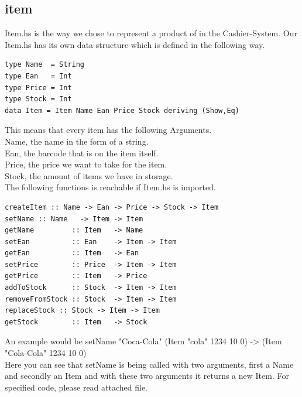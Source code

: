 \documentclass[11pt]{article}
\begin{document}
\subsection{item}
Item.hs is the way we chose to represent a product of in the Cashier-System. Our Item.hs has its own data structure which is defined in the following way.
\begin{lstlisting}
type Name  = String
type Ean   = Int
type Price = Int
type Stock = Int
data Item = Item Name Ean Price Stock deriving (Show,Eq)
\end{lstlisting}
This means that every item has the following Arguments.\\
Name, the name in the form of a string.\\
Ean, the barcode that is on the item itself.\\
Price, the price we want to take for the item.\\
Stock, the amount of items we have in storage.\\
The following functions is reachable if Item.hs is imported.\\
\begin{lstlisting}
createItem :: Name -> Ean -> Price -> Stock -> Item
setName :: Name   -> Item -> Item
getName         :: Item   -> Name
setEan          :: Ean    -> Item -> Item
getEan          :: Item   -> Ean
setPrice        :: Price  -> Item -> Item
getPrice        :: Item   -> Price
addToStock      :: Stock  -> Item -> Item
removeFromStock :: Stock  -> Item -> Item
replaceStock :: Stock -> Item -> Item
getStock        :: Item   -> Stock
\end{lstlisting}
An example would be setName "Coca-Cola" (Item "cola" 1234 10 0) -> (Item "Cola-Cola" 1234 10 0)\\
Here you can see that setName is being called with two arguments, first a Name and secondly an Item and with these two arguments it returns a new Item. For specified code, please read attached file.
\end{document}
